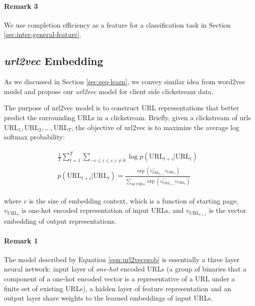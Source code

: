 \paragraph{Remark 3} We use completion efficiency as a feature for a classification task 
in Section \ref{sec:inter-general-feature}.

\subsection{\emph{url2vec} Embedding}

As we discussed in Section \ref{sec:seq-learn}, we convey similar idea from word2vec model 
and propose our \emph{url2vec} model for client side clickstream data.

The purpose of url2vec model is to construct URL representations that better predict 
the surrounding URLs in a clickstream. Briefly, given a clickstream of urls 
$\text{URL}_1, \text{URL}_2, ..., \text{URL}_T$, the objective of url2vec is to maximize 
the average log softmax probability:

\begin{align}
\label{eqn:url2vecprob}
\begin{split}
    \frac{1}{T}\sum^{T}_{t=1}\sum_{-c \leq i \leq c, i \neq 0} {\log{p(\text{URL}_{t+i} | \text{URL}_t)}}\\
    p(\text{URL}_{t+i} | \text{URL}_t) = \frac{
        \exp{(v_{\text{URL}_{t+i}} ^\top v_{\text{URL}_t})}
    }{
        \sum_{\text{all URLs}} {\exp{(v_{\text{URL}_{t+i}} ^\top v_{\text{URL}_t})}}
    }
\end{split}
\end{align}

where $c$ is the size of embedding context, which is a function of starting page,
$v_{\text{URL}_t}$ is one-hot encoded representation of input URLs, and 
$v_{\text{URL}_{t+i}}$ is the vector embedding of output representations.

\paragraph{Remark 1} The model described by Equation \ref{eqn:url2vecprob} is essentially
a three layer neural network: input layer of \emph{one-hot} encoded URLs (a group of binaries
that a component of a one-hot encoded vector is a representative of a URL under a finite set
of existing URLs), a hidden layer of feature representation and an output layer 
share weights to the learned embeddings of input URLs.

